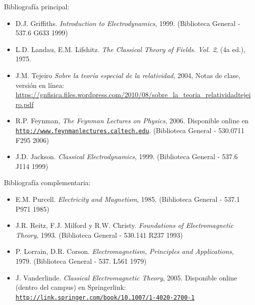 \documentclass[letterpaper,10pt,onecolumn]{article}
\begin{document}

\noindent\normalsize Bibliograf\'ia principal:

\begin{itemize}
	\item D.J. Griffiths. \textit{Introduction to
          Electrodynamics}, 1999. (Biblioteca General - 537.6 G633
          1999) 
        \item L.D. Landau, E.M. Lifshitz. \textit{The Classical
          Theory of Fields. Vol. 2}, (4a ed.), 1975.
        \item J.M. Tejeiro \textit{Sobre la teor\'ia especial de la
          relatividad}, 2004, Notas de clase, versi\'on en l\'inea:
          \url{https://gnfisica.files.wordpress.com/2010/08/sobre_la_teoria_relatividadtejeiro.pdf} 
	\item R.P. Feynman, \textit{The Feynman Lectures on Physics},
          2006. Disponible online en
          \href{http://www.feynmanlectures.caltech.edu}{\nolinkurl{http://www.feynmanlectures.caltech.edu}}. (Biblioteca
          General - 530.0711 F295 2006)\\[-0.6cm] 
	\item J.D. Jackson. \textit{Classical Electrodynamics},
          1999. (Biblioteca General - 537.6 J114 1999)\\[-0.6cm] 
\end{itemize}

\noindent\normalsize Bibliograf\'ia complementaria:

\begin{itemize}
	\item E.M. Purcell. \textit{Electricity and Magnetism},
          1985. (Biblioteca General - 537.1 P971 1985)\\[-0.6cm] 
	\item J.R. Reitz, F.J. Milford y
          R.W. Christy. \textit{Foundations of Electromagnetic
            Theory}, 1993. (Biblioteca General - 530.141 R237
          1993)\\[-0.6cm] 
	\item P. Lorrain, D.R. Corson. \textit{Electromagnetism,
          Principles and Applications}, 1979. (Biblioteca General -
          537. L561 1979)\\[-0.6cm] 
	\item J. Vanderlinde. \textit{Classical Electromagnetic Theory}, 2005. Disponible online (dentro del campus) en Springerlink:\\
	\href{http://link.springer.com/book/10.1007/1-4020-2700-1}{\nolinkurl{http://link.springer.com/book/10.1007/1-4020-2700-1}} 
\end{itemize}

\nocite{*}

\medskip


\end{document}
